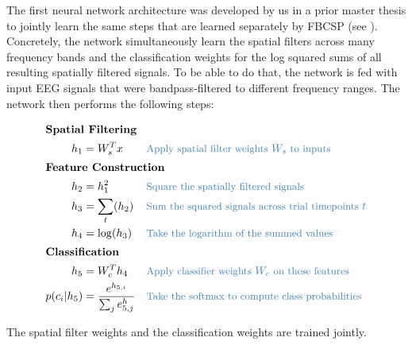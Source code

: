     The first neural network architecture was developed by us in a prior
master thesis \citep{schirrmeister_msc_thesis_2015} to
jointly learn the same steps that are learned separately by FBCSP (see
). Concretely, the network
simultaneously learn the spatial filters across many frequency bands and
the classification weights for the log squared sums of all resulting
spatially filtered signals. To be able to do that, the network is fed
with input EEG signals that were bandpass-filtered to different
frequency ranges. The network then performs the following steps:




\begin{align*}
    \intertext{\textbf{Spatial Filtering}}
    h_1 &= W_s^Tx && \color{commentcolor}{\small \text{Apply spatial filter weights } W_s \text{ to  inputs }} \\
    \intertext{\textbf{Feature Construction}}
    h_2 &= h_1^2 && \color{commentcolor}{\small \text{Square the spatially filtered signals }} \\
    h_3 &=\sum_t (h_2) && \color{commentcolor}{\small \text{Sum the squared signals across trial timepoints } t} \\
    h_4 &= \log(h_3) && \color{commentcolor}{\small\text{Take the logarithm of the summed values}}\\
    \intertext{\textbf{Classification}}
    h_5 &= W_c^Th_4 && \color{commentcolor}{\small \text{Apply classifier weights } W_c \text{ on these features }} \\
    p(c_i|h_5) &= \frac{e^{h_{5,i}}}{\sum_j e^h_{5,j}} && \color{commentcolor}{\small \text{Take the softmax to compute class probabilities}} \\
\end{align*}

    The spatial filter weights and the classification weights are trained
jointly.


